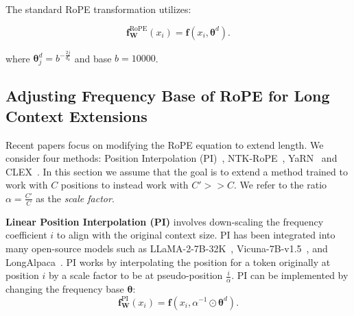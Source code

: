 \documentclass{article}
\begin{document}
The standard RoPE transformation utilizes: 

\begin{equation}
\mathbf{f}_\mathbf{W}^{\text{RoPE}}(x_i) = \mathbf{f}(x_i, \bm{\theta}^d).
\end{equation}

where $\bm{\theta}^d_j = b^{-\frac{2j}{d_k}}$ and base $b=10000$. 






\subsection{Adjusting Frequency Base of RoPE for Long Context Extensions}

Recent papers focus on modifying the RoPE equation to extend length. We consider four methods: Position Interpolation (PI)~\citep{chen2023extending}, NTK-RoPE~\citep{emozillareddit}, YaRN~\citep{peng2023yarn} and CLEX~\citep{chen2024clexcontinuouslengthextrapolation}. In this section we assume that the goal is to extend a method trained to work with $C$ positions to instead work with $C' >> C$. We refer to the ratio $\alpha = \frac{C'}{C}$ as the \textit{scale factor}.

\textbf{Linear Position Interpolation (PI)} involves down-scaling the frequency coefficient $i$ to align with the original context size. PI has been integrated into many open-source models such as LLaMA-2-7B-32K~\citep{together-instruct}, Vicuna-7B-v1.5~\citep{vicuna2023}, and LongAlpaca~\citep{chen2023longlora}. PI works by interpolating the position for a token originally at position $i$ by a scale factor to be at pseudo-position $\frac{i}{\alpha}$.
 PI can be implemented by changing the frequency base $\bm{\theta}$:
\begin{equation}
\mathbf{f}_\mathbf{W}^{\text{PI}}(x_i) = \mathbf{f}(x_i, \alpha^{-1} \odot \bm{\theta}^d).
\end{equation}
\end{document}
